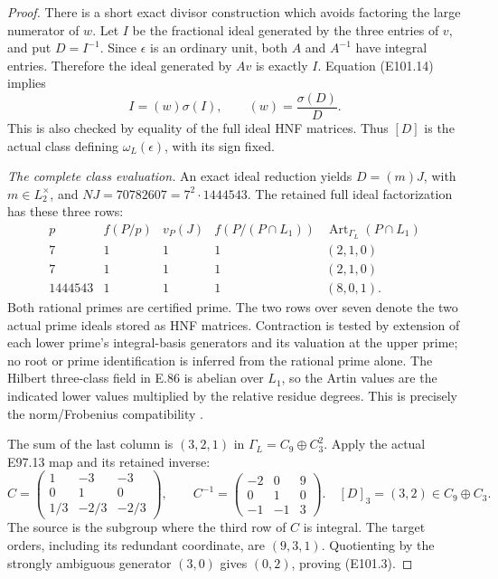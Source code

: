 \begin{proof}
There is a short exact divisor construction which
avoids factoring the large numerator of \(w\).
Let \(I\) be the fractional ideal generated by the
three entries of \(v\), and put \(D=I^{-1}\).
Since \(\epsilon\) is an ordinary unit, both \(A\)
and \(A^{-1}\) have integral entries. Therefore the
ideal generated by \(Av\) is exactly \(I\).
Equation (E101.14) implies
\[
            I=(w)\sigma(I),\qquad
            (w)=\frac{\sigma(D)}D.
 \tag{E101.15}
\]
This is also checked by equality of the full ideal
HNF matrices. Thus \([D]\) is the actual class
defining \(\omega_L(\epsilon)\), with its sign fixed.

\emph{The complete class evaluation.}
An exact ideal reduction yields \(D=(m)J\), with
\(m\in L_2^\times\), and
\(N J=70782607=7^2\cdot1444543\).
The retained full ideal factorization has these three rows:
\[
 \begin{array}{c|c|c|c|c}
 p&f(P/p)&v_P(J)&f(P/(P\cap L_1))&
       \operatorname{Art}_{\Gamma_L}(P\cap L_1)\\ \hline
 7&1&1&1&(2,1,0)\\
 7&1&1&1&(2,1,0)\\
 1444543&1&1&1&(8,0,1).
 \end{array}
 \tag{E101.16}
\]
Both rational primes are certified prime. The two rows
over seven denote the two actual prime ideals stored
as HNF matrices. Contraction is tested by extension
of each lower prime's integral-basis generators and
its valuation at the upper prime; no root or prime
identification is inferred from the rational prime alone.
The Hilbert three-class field in E.86 is abelian over
\(L_1\), so the Artin values are the indicated lower
values multiplied by the relative residue degrees.
This is precisely the norm/Frobenius compatibility
\cite[V, Proposition3.3, Theorem3.6 and Example3.9]{E_MilneCFT}.

The sum of the last column is \((3,2,1)\) in
\(\Gamma_L=C_9\oplus C_3^2\).
Apply the actual E97.13 map and its retained inverse:
\[
 C=\begin{pmatrix}1&-3&-3\\0&1&0\\1/3&-2/3&-2/3\end{pmatrix},
 \qquad
 C^{-1}=\begin{pmatrix}-2&0&9\\0&1&0\\-1&-1&3\end{pmatrix}.
 \quad [D]_3=(3,2)\in C_9\oplus C_3.
 \tag{E101.17}
\]
The source is the subgroup where the third row of
\(C\) is integral. The target orders, including its
redundant coordinate, are \((9,3,1)\).
Quotienting by the strongly ambiguous generator
\((3,0)\) gives \((0,2)\), proving (E101.3).


\end{proof}
